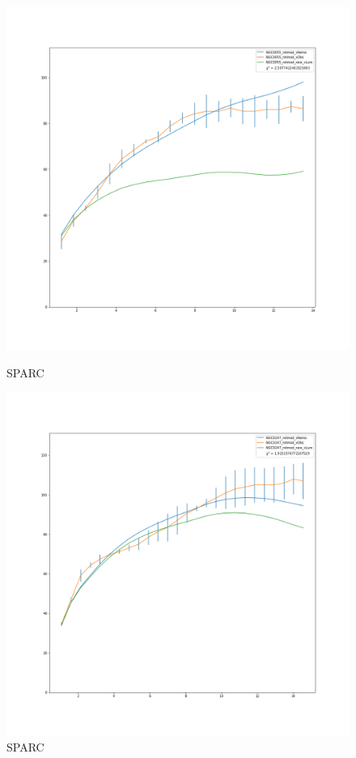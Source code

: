 \documentclass[reprint,%
 amsmath,amssymb,
 aps,
]{revtex4-1}
\begin{document}
\begin{figure} 
\centering
\begin{minipage}{0.5\textwidth}
  \includegraphics[width=.8\linewidth]{figures/NGC0055_rotmod_XueSofue.png}
\caption{ SPARC\cite{2016Lelli}}
\label{fig:5055}
\end{minipage}
\begin{minipage}{0.5\textwidth}
  \includegraphics[width=.8\linewidth]{figures/NGC0247_rotmod_XueSofue.png}
\caption{ SPARC\cite{2016Lelli}}
\label{fig:2915}
\end{minipage}
\end{figure}
\end{document}
